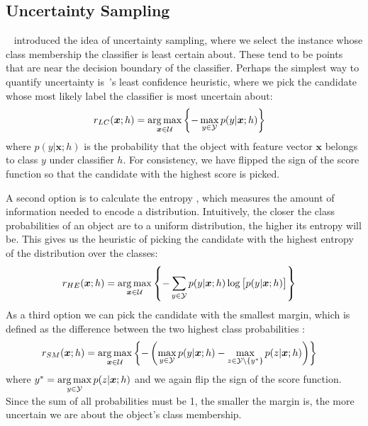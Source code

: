 \documentclass[fleqn,10pt,lineno]{wlpeerj} %
\newcommand{\Y}{\mathcal{Y}}
\newcommand{\Unlabeled}{\mathcal{U}}
\newcommand*{\argmax}{\operatornamewithlimits{arg\,max}\limits}
\begin{document}
\subsection{Uncertainty Sampling}~\label{subsec:uncertainty}
\cite{lewis94} introduced the idea of uncertainty sampling, where we select the
instance whose class membership the classifier is least certain about. These
tend to be points that are near the decision boundary of the classifier.
Perhaps the simplest way to quantify uncertainty is~\cite{culotta05}'s least
confidence heuristic, where we pick the candidate whose most likely label the
classifier is most uncertain about:
\begin{align}
	r_{LC}(\bm{x}; h) &= \argmax_{\bm{x} \in \Unlabeled}
	\left\{ - \max_{y \in \Y} p(y | \bm{x}; h) \right\}
\end{align}
where $p(y | \bm{x}; h)$ is the probability that the object with feature vector
$\bm{x}$ belongs to class $y$ under classifier $h$. For consistency, we have
flipped the sign of the score function so that the candidate with the highest
score is picked.

A second option is to calculate the entropy \citep{shannon48}, which measures
the amount of information needed to encode a distribution. Intuitively, the
closer the class probabilities of an object are to a uniform distribution, the
higher its entropy will be. This gives us the heuristic of picking the
candidate with the highest entropy of the distribution over the classes:
\begin{align}
	r_{HE}(\bm{x}; h) &= \argmax_{\bm{x} \in \Unlabeled}
	\left\{ - \sum_{y \in \Y} p(y | \bm{x}; h)
	\log \big[ p(y | \bm{x}; h) \big] \right\}
\end{align}
As a third option we can pick the candidate with the smallest margin, which is defined as
the difference between the two highest class probabilities \citep{scheffer01}:
\begin{align}
	r_{SM}(\bm{x}; h) &= \argmax_{\bm{x} \in \Unlabeled}
	\left\{ - \left ( \max_{y \in \Y} p(y | \bm{x}; h) -
	\max_{z \in \Y \setminus \{y^*\}} p(z | \bm{x}; h) \right) \right\}
\end{align}
where $y^* = \argmax_{y \in \Y} p(z | \bm{x}; h)$ and we again flip the sign
of the score function. Since the sum of all probabilities must be 1, the
smaller the margin is, the more uncertain we are about the object's class
membership.
\end{document}
